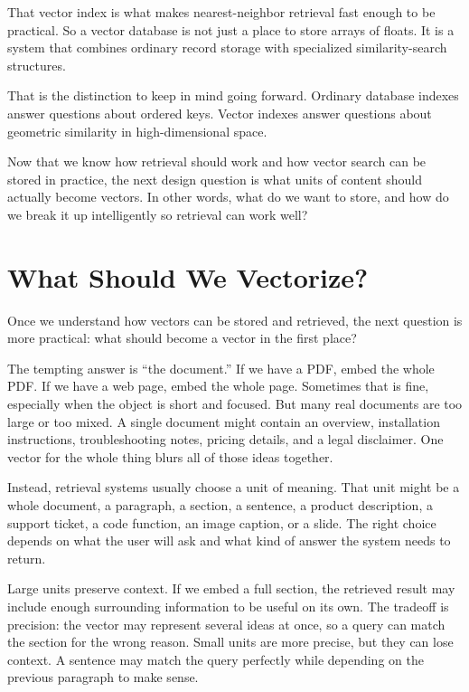 \documentclass[12pt]{article}
\begin{document}
That vector index is what makes nearest-neighbor retrieval fast enough to
be practical. So a vector database is not just a place to store arrays of
floats. It is a system that combines ordinary record storage with
specialized similarity-search structures.

That is the distinction to keep in mind going forward. Ordinary database
indexes answer questions about ordered keys. Vector indexes answer
questions about geometric similarity in high-dimensional space.

Now that we know how retrieval should work and how vector search can be
stored in practice, the next design question is what units of content
should actually become vectors. In other words, what do we want to store,
and how do we break it up intelligently so retrieval can work well?

\section{What Should We Vectorize?}

Once we understand how vectors can be stored and retrieved, the next
question is more practical: what should become a vector in the first
place?

The tempting answer is ``the document.'' If we have a PDF, embed the whole
PDF. If we have a web page, embed the whole page. Sometimes that is fine,
especially when the object is short and focused. But many real documents
are too large or too mixed. A single document might contain an overview,
installation instructions, troubleshooting notes, pricing details, and a
legal disclaimer. One vector for the whole thing blurs all of those ideas
together.

Instead, retrieval systems usually choose a unit of meaning. That unit
might be a whole document, a paragraph, a section, a sentence, a product
description, a support ticket, a code function, an image caption, or a
slide. The right choice depends on what the user will ask and what kind
of answer the system needs to return.

Large units preserve context. If we embed a full section, the retrieved
result may include enough surrounding information to be useful on its own.
The tradeoff is precision: the vector may represent several ideas at
once, so a query can match the section for the wrong reason. Small units
are more precise, but they can lose context. A sentence may match the
query perfectly while depending on the previous paragraph to make sense.
\end{document}
